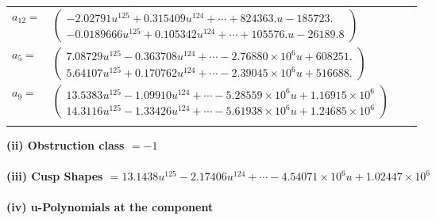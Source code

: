 \documentclass[1p]{elsarticle_modified}
\theoremstyle{definition}
\begin{document}
\begin{tabular}{m{7pt} m{180pt} m{7pt} m{180pt} }
\flushright $a_{12}=$&$\begin{pmatrix}-2.02791 u^{125}+0.315409 u^{124}+\cdots+824363. u-185723.\\-0.0189666 u^{125}+0.105342 u^{124}+\cdots+105576. u-26189.8\end{pmatrix}$ \\
\flushright $a_{5}=$&$\begin{pmatrix}7.08729 u^{125}-0.363708 u^{124}+\cdots-2.76880\times10^{6} u+608251.\\5.64107 u^{125}+0.170762 u^{124}+\cdots-2.39045\times10^{6} u+516688.\end{pmatrix}$ \\
\flushright $a_{9}=$&$\begin{pmatrix}13.5383 u^{125}-1.09910 u^{124}+\cdots-5.28559\times10^{6} u+1.16915\times10^{6}\\14.3116 u^{125}-1.33426 u^{124}+\cdots-5.61938\times10^{6} u+1.24685\times10^{6}\end{pmatrix}$\\&\end{tabular}
\flushleft \textbf{(ii) Obstruction class $= -1$}\\~\\
\flushleft \textbf{(iii) Cusp Shapes $= 13.1438 u^{125}-2.17406 u^{124}+\cdots-4.54071\times10^{6} u+1.02447\times10^{6}$}\\~\\
\newpage\renewcommand{\arraystretch}{1}
\flushleft \textbf{(iv) u-Polynomials at the component}\newline \\
\end{document}
